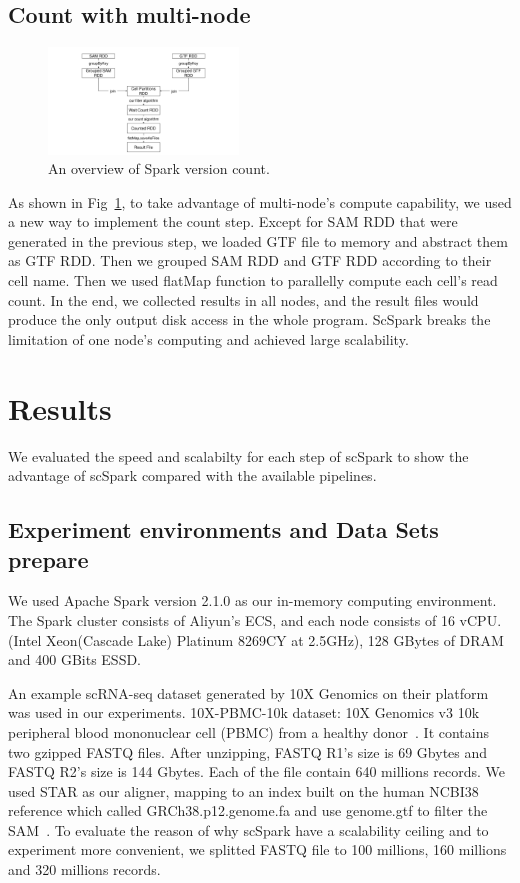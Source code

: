 \documentclass[10pt,journal,compsoc]{IEEEtran}
\begin{document}
\subsection{Count with multi-node}
\begin{figure}
	\includegraphics[width=0.45\textwidth]{fig3.pdf}
	\caption{An overview of Spark version count.} \label{fig3}
\end{figure}
As shown in Fig~\ref{fig3}, to take advantage of multi-node's compute capability, we used a new way to implement the count step. 
Except for SAM RDD that were generated in the previous step, we loaded GTF file to memory and abstract them as GTF RDD. 
Then we grouped SAM RDD and GTF RDD according to their cell name. 
Then we used flatMap function to parallelly compute each cell's read count. 
In the end, we collected results in all nodes, and the result files would produce the only output disk access in the whole program. 
ScSpark breaks the limitation of one node's computing and achieved large scalability. 

\section{Results}
We evaluated the speed and scalabilty for each step of scSpark to show the advantage of scSpark compared with the available pipelines. 
\subsection{Experiment environments and Data Sets prepare}
We used Apache Spark version 2.1.0 as our in-memory computing environment.
The Spark cluster consists of Aliyun's ECS, and each node consists of 16 vCPU.
(Intel Xeon(Cascade Lake) Platinum 8269CY at 2.5GHz), 128 GBytes of DRAM and 400 GBits ESSD.

An example scRNA-seq dataset generated by 10X Genomics on their platform was used in our experiments.
10X-PBMC-10k dataset: 10X Genomics v3 10k peripheral blood mononuclear cell (PBMC) from a healthy donor~\cite{ref_url4}.
It contains two gzipped FASTQ files. After unzipping, FASTQ R1's size is 69 Gbytes and FASTQ R2's size is 144 Gbytes. Each of the file contain 640 millions records.
We used STAR as our aligner, mapping to an index built on the human NCBI38 reference which called GRCh38.p12.genome.fa and use genome.gtf to filter the SAM~\cite{ref_url5}.
To evaluate the reason of why scSpark have a scalability ceiling and to experiment more convenient, we splitted FASTQ file to 100 millions, 160 millions and 320 millions records. 
\end{document}
